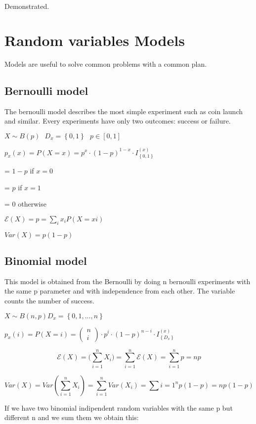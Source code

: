 \documentclass{article}
\begin{document}
Demonstrated.

\section{Random variables Models}

Models are useful to solve common problems with a common plan.

\subsection{Bernoulli model}

The bernoulli model describes the most simple experiment such as coin launch and similar. Every experiments have only two outcomes: success or failure.
\bigskip

$X \sim B(p) \ \ \ D_x = \left\{0,1\right\} \ \ \ p \in [0,1]$
\bigskip

$p_x(x) = P(X=x) = p^x \cdot(1-p)^{1-x} \cdot I_\left\{0,1\right\}^{(x)}$

= $1-p$ if $x = 0$ 

= $p$ if $x = 1$

= 0 otherwise
\bigskip

$\mathcal E(X) = p = \sum_{i}x_i P(X=xi)$

$Var(X)=p(1-p)$

\subsection{Binomial model}

This model is obtained from the Bernoulli by doing n bernoulli experiments with the same p parameter and with independence from each other. The variable counts the number of success.

$X \sim B(n,p) D_x = \left\{0,1,...,n\right\}$
\bigskip

$p_x(i) = P(X=i) = \left(\begin{array}{c} n \\ i \end{array} \right) \cdot p^i \cdot (1-p)^{n-i}\cdot I_\left\{D_x\right\}^{(x)}$
\bigskip

$$\mathcal E(X) = \mathcal(\sum_{i=1}^n X_i) = \sum_{i=1}^n \mathcal E(X) = \sum_{i=1}^n p = np$$

$$Var(X) = Var(\sum_{i=1}^n X_i) = \sum_{i=1}^nVar(X_i) = \sum{i=1}^np(1-p) = np(1-p)$$
\bigskip

If we have two binomial indipendent random variables with the same p but different n and we sum them we obtain this:
\end{document}
